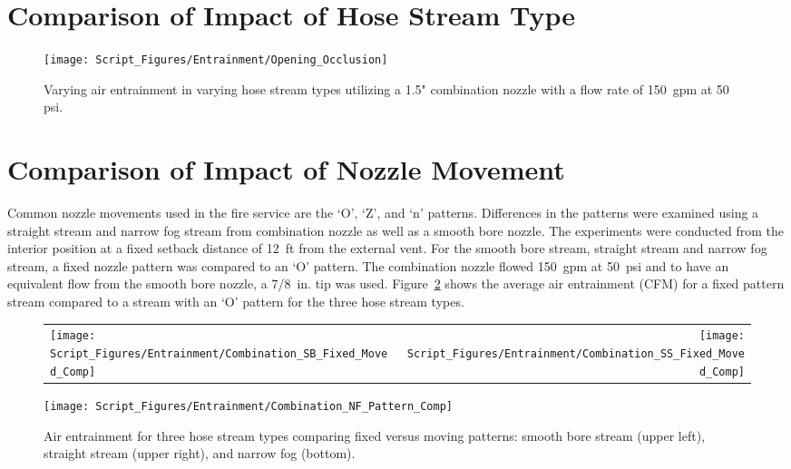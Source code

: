 \documentclass[12pt,oneside]{book}
\begin{document}
\section{Comparison of Impact of Hose Stream Type}

\begin{figure}[!ht]
	\centering
	\texttt{[image: Script\_Figures/Entrainment/Opening\_Occlusion]}
	\caption{Varying air entrainment in varying hose stream types utilizing a 1.5" combination nozzle with a flow rate of 150~gpm at 50 psi.}
	\label{fig:Opening_Occlusion}
\end{figure}


\section{Comparison of Impact of Nozzle Movement}

Common nozzle movements used in the fire service are the `O', `Z', and `n' patterns. Differences in the patterns were examined using a straight stream and narrow fog stream from combination nozzle as well as a smooth bore nozzle. The experiments were conducted from the interior position at a fixed setback distance of 12~ft from the external vent. For the smooth bore stream, straight stream and narrow fog stream, a fixed nozzle pattern was compared to an `O' pattern. The combination nozzle flowed 150~gpm at 50~psi and to have an equivalent flow from the smooth bore nozzle, a 7/8~in. tip was used. Figure~\ref{fig:SB_SS_NF_Movement_Comparison} shows the average air entrainment (CFM) for a fixed pattern stream compared to a stream with an `O' pattern for the three hose stream types.

\begin{figure}[!ht]
\begin{tabular*}{\textwidth}{lr}
\texttt{[image: Script\_Figures/Entrainment/Combination\_SB\_Fixed\_Moved\_Comp]} &
\texttt{[image: Script\_Figures/Entrainment/Combination\_SS\_Fixed\_Moved\_Comp]} \\
\end{tabular*}
\centering
\texttt{[image: Script\_Figures/Entrainment/Combination\_NF\_Pattern\_Comp]} \\
\caption[Air Entrainment Comparison of Fixed Versus Moving Patterns]{Air entrainment for three hose stream types comparing fixed versus moving patterns: smooth bore stream (upper left), straight stream (upper right), and narrow fog (bottom).}
\label{fig:SB_SS_NF_Movement_Comparison}
\end{figure}
\end{document}
